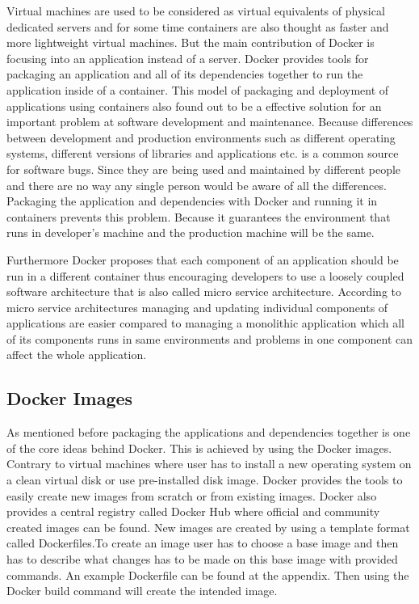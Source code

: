 \documentclass[12pt,oneandhalf,chaparabic,ceng,ms,eng,oneside,pntc]{gsufbe}
\begin{document}
Virtual machines are used to be considered as virtual equivalents of physical dedicated servers and for
some time containers are also thought as faster and more lightweight virtual machines. But the main
contribution of Docker is focusing into an application instead of a server. Docker provides tools for
packaging an application and all of its dependencies together to run the application inside of a
container. This model of packaging and deployment of applications using containers also found out to be
a effective solution for an important problem at software development and maintenance. Because 
differences between development and production environments such as different operating systems, 
different versions of libraries and applications etc. is a common source for software bugs. Since they
are being used and  maintained by different people and there are no way any single person would be
aware of all the differences. Packaging the application and dependencies with Docker and running it in
containers prevents this problem. Because it guarantees the environment that runs in developer’s
machine and the production machine will be the same.

Furthermore Docker proposes that each component of an application should be run in a 
different container thus encouraging developers to use a loosely coupled software architecture that is 
also called micro service architecture. According to micro service architectures managing and updating
individual components of applications are easier compared to managing a monolithic application which
all of its components runs in same environments and problems in one component can affect the whole
application.

\subsection{Docker Images}
As mentioned before packaging the applications and dependencies together is one of the core ideas
behind Docker. This is achieved by using the Docker images. Contrary to virtual machines where user
has to install a new operating system on a clean virtual disk or use pre-installed disk image. Docker 
provides the tools to easily create new images from scratch or from existing images. Docker also
provides a central registry called Docker Hub where official and community created images can be found.
New images are created by using a template format called Dockerfiles.To create an image user has to
choose a base image and then has to describe what changes has to be made on this base image with
provided commands. An example Dockerfile can be found at the appendix. Then using the Docker build
command will create the intended image.
\end{document}
